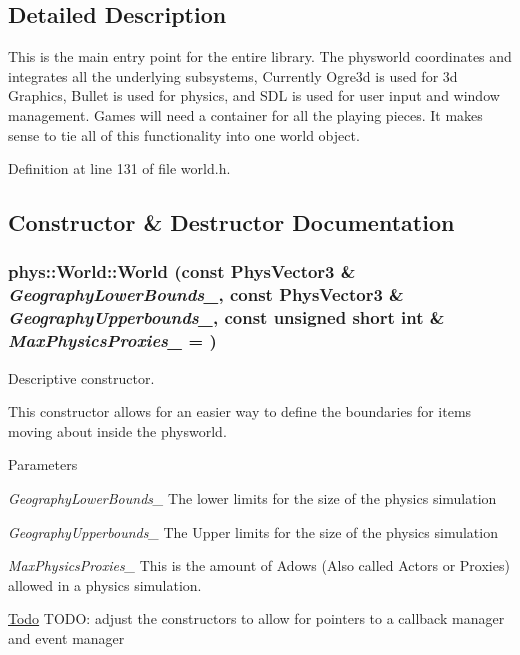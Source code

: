 \subsection{Detailed Description}
This is the main entry point for the entire library. The physworld coordinates and integrates all the underlying subsystems, Currently Ogre3d is used for 3d Graphics, Bullet is used for physics, and SDL is used for user input and window management. Games will need a container for all the playing pieces. It makes sense to tie all of this functionality into one world object. 

Definition at line 131 of file world.h.



\subsection{Constructor \& Destructor Documentation}
\hypertarget{classphys_1_1World_a1f020a5a49a3bbfca6d570db44e72beb}{
\subsubsection[{World}]{\setlength{\rightskip}{0pt plus 5cm}phys::World::World (const {\bf PhysVector3} \& {\em GeographyLowerBounds\_\-}, \/  const {\bf PhysVector3} \& {\em GeographyUpperbounds\_\-}, \/  const unsigned short int \& {\em MaxPhysicsProxies\_\-} = {})}}
\label{da/ddf/classphys_1_1World_a1f020a5a49a3bbfca6d570db44e72beb}


Descriptive constructor. 

This constructor allows for an easier way to define the boundaries for items moving about inside the physworld. 
\begin{DoxyParams}{Parameters}
\item[{\em GeographyLowerBounds\_\-}]The lower limits for the size of the physics simulation \item[{\em GeographyUpperbounds\_\-}]The Upper limits for the size of the physics simulation \item[{\em MaxPhysicsProxies\_\-}]This is the amount of Adows (Also called Actors or Proxies) allowed in a physics simulation.\end{DoxyParams}
\begin{Desc}
\item[\hyperlink{todo__todo000015}{Todo}]TODO: adjust the constructors to allow for pointers to a callback manager and event manager \end{Desc}


